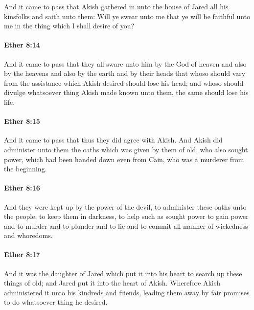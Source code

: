 			And it came to pass that
			Akish gathered in unto the house of Jared all his kinsfolks
			and saith unto them:
			Will ye swear unto me that ye will be faithful unto me
			in the thing which I shall desire of you?

		\paragraph{Ether 8:14} %
			\label{ETHER-8-14}

			And it came to pass that they all sware unto him by the God of heaven
			and also by the heavens and also by the earth and by their heads
			that whoso should vary from the assistance which Akish desired
			should lose his head;
			and whoso should divulge whatsoever thing Akish made known unto them,
			the same should lose his life.

		\paragraph{Ether 8:15} %
			\label{ETHER-8-15}

			And it came to pass that thus they did agree with Akish.
			And Akish did administer unto them the oaths
			which was given by them of old, who also sought power,
			which had been handed down even from Cain,
			who was a murderer from the beginning.

		\paragraph{Ether 8:16} %
			\label{ETHER-8-16}

			And they were kept up by the power of the devil,
			to administer these oaths unto the people, to keep them in darkness,
			to help such as sought power to gain power
			and to murder and to plunder and to lie
			and to commit all manner of wickedness and whoredoms.

		\paragraph{Ether 8:17} %
			\label{ETHER-8-17}

			And it was the daughter of Jared
			which put it into his heart to search up these things of old;
			and Jared put it into the heart of Akish.
			Wherefore Akish administered it unto his kindreds and friends,
			leading them away by fair promises to do whatsoever thing he desired.

